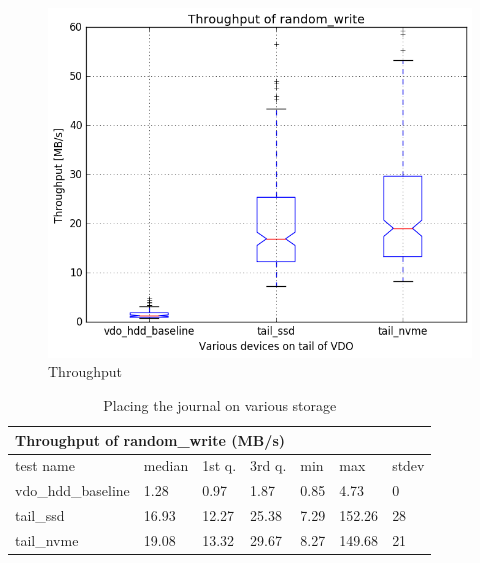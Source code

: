\documentclass[
  color, %
  table, %
  lof,   %
  lot,   %
]{fithesis3}
\begin{document}
\begin{figure}[!htb]
        \centering
        \includegraphics[width=\textwidth]{../results/journal/report/random_write1_compare_boxplots}
\caption[Journal]{Throughput}
\label{fig:journal-all}
\end{figure}

\begin{table}[!htb]
\centering
\begin{tabular}{|l|l|l|l|l|l|l|}
        \hline
        \multicolumn{7}{|l|}{Throughput of random\_write (MB/s)} \\ \hline
        test name & median & 1st q. & 3rd q. & min & max & stdev \\ \hline 
vdo\_hdd\_baseline & 1.28 & 0.97 & 1.87 & 0.85 & 4.73 & 0 \\ \hline
tail\_ssd & 16.93 & 12.27 & 25.38 & 7.29 & 152.26 & 28 \\ \hline
tail\_nvme & 19.08 & 13.32 & 29.67 & 8.27 & 149.68 & 21 \\ \hline

\end{tabular}

\caption{Placing the journal on various storage}
\label{tab:journal}
\end{table}
\end{document}

